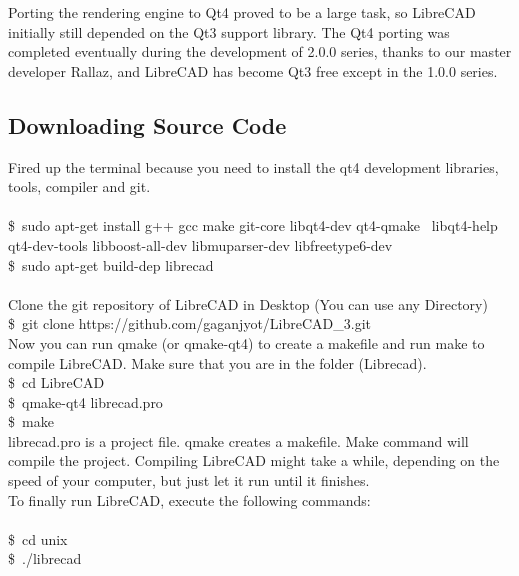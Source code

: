 Porting  the  rendering  engine  to  Qt4  proved  to  be  a  large  task,  so  LibreCAD  initially  still  depended  on the  Qt3  support  library.  The  Qt4  porting  was  completed  eventually  during  the  development  of  2.0.0 series,  thanks  to  our  master  developer  Rallaz,  and  LibreCAD  has  become  Qt3  free except in the 1.0.0 series.\\

\subsection{Downloading Source Code}

Fired up the terminal because you need to install the qt4 development libraries, tools, compiler and git.\\ \\

\$\ sudo apt-get install g++ gcc make git-core libqt4-dev qt4-qmake \
libqt4-help qt4-dev-tools libboost-all-dev libmuparser-dev libfreetype6-dev \\

\$\ sudo apt-get build-dep librecad\\ \\
Clone the git repository of LibreCAD in Desktop (You can use any Directory)\\

\$\ git clone https://github.com/gaganjyot/LibreCAD\_3.git \\ 

Now you can run qmake (or qmake-qt4) to create a makefile and run make to compile LibreCAD.
Make sure that you are in the folder (Librecad).\\

\$\ cd LibreCAD \\

\$\ qmake-qt4 librecad.pro\\

\$\ make\\

librecad.pro  is  a  project  file.  qmake  creates  a  makefile.  Make  command  will  compile  the  project.
Compiling  LibreCAD  might  take  a while,   depending  on  the  speed  of  your  computer,  but  just  let  it  run
until it finishes.\\

To finally run LibreCAD, execute the following commands:\\\\

\$\ cd unix\\

\$\ ./librecad

